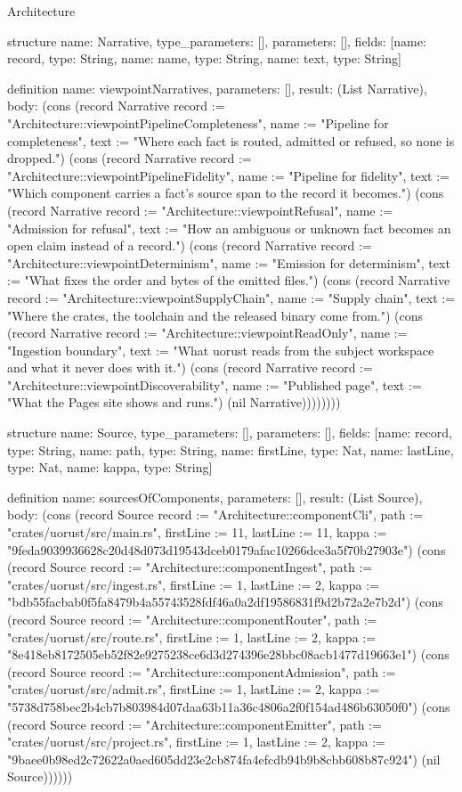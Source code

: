 \begin{lexlean}{Architecture}
\begin{semanticmodule}
structure{
  name: Narrative,
  type_parameters: [],
  parameters: [],
  fields: [{name: record, type: String}, {name: name, type: String}, {name: text, type: String}]
}

definition{
  name: viewpointNarratives,
  parameters: [],
  result: (List Narrative),
  body: (cons (record Narrative {record := "Architecture::viewpointPipelineCompleteness", name := "Pipeline for completeness", text := "Where each fact is routed, admitted or refused, so none is dropped."}) (cons (record Narrative {record := "Architecture::viewpointPipelineFidelity", name := "Pipeline for fidelity", text := "Which component carries a fact's source span to the record it becomes."}) (cons (record Narrative {record := "Architecture::viewpointRefusal", name := "Admission for refusal", text := "How an ambiguous or unknown fact becomes an open claim instead of a record."}) (cons (record Narrative {record := "Architecture::viewpointDeterminism", name := "Emission for determinism", text := "What fixes the order and bytes of the emitted files."}) (cons (record Narrative {record := "Architecture::viewpointSupplyChain", name := "Supply chain", text := "Where the crates, the toolchain and the released binary come from."}) (cons (record Narrative {record := "Architecture::viewpointReadOnly", name := "Ingestion boundary", text := "What uorust reads from the subject workspace and what it never does with it."}) (cons (record Narrative {record := "Architecture::viewpointDiscoverability", name := "Published page", text := "What the Pages site shows and runs."}) (nil Narrative))))))))
}

structure{
  name: Source,
  type_parameters: [],
  parameters: [],
  fields: [{name: record, type: String}, {name: path, type: String}, {name: firstLine, type: Nat}, {name: lastLine, type: Nat}, {name: kappa, type: String}]
}

definition{
  name: sourcesOfComponents,
  parameters: [],
  result: (List Source),
  body: (cons (record Source {record := "Architecture::componentCli", path := "crates/uorust/src/main.rs", firstLine := 11, lastLine := 11, kappa := "9feda9039936628c20d48d073d19543dceb0179afac10266dce3a5f70b27903e"}) (cons (record Source {record := "Architecture::componentIngest", path := "crates/uorust/src/ingest.rs", firstLine := 1, lastLine := 2, kappa := "bdb55facbab0f5fa8479b4a55743528fdf46a0a2df19586831f9d2b72a2e7b2d"}) (cons (record Source {record := "Architecture::componentRouter", path := "crates/uorust/src/route.rs", firstLine := 1, lastLine := 2, kappa := "8e418eb8172505eb52f82e9275238ce6d3d274396e28bbc08acb1477d19663e1"}) (cons (record Source {record := "Architecture::componentAdmission", path := "crates/uorust/src/admit.rs", firstLine := 1, lastLine := 2, kappa := "5738d758bec2b4cb7b803984d07daa63b11a36c4806a2f0f154ad486b63050f0"}) (cons (record Source {record := "Architecture::componentEmitter", path := "crates/uorust/src/project.rs", firstLine := 1, lastLine := 2, kappa := "9baee0b98ed2c72622a0aed605dd23e2cb874fa4efcdb94b9b8cbb608b87c924"}) (nil Source))))))
}


\end{semanticmodule}
\end{lexlean}
